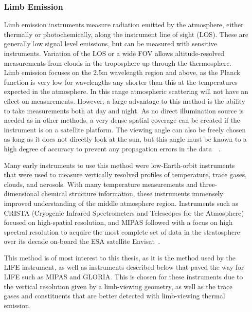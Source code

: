 \subsubsection{Limb Emission}
Limb emission instruments measure radiation emitted by the atmosphere, either thermally or photochemically, along the instrument line of sight (LOS). These are generally low signal level emissions, but can be measured with sensitive instruments. Variation of the LOS or a wide FOV allows altitude-resolved measurements from clouds in the troposphere up through the thermosphere. Limb emission focuses on the 2.5\textmu m wavelength region and above, as the Planck function is very low for wavelengths any shorter than this at the temperatures expected in the atmosphere. In this range atmospheric scattering will not have an effect on measurements. However, a large advantage to this method is the ability to take measurements both at day and night. As no direct illumination source is needed as in other methods, a very dense spatial coverage can be created if the instrument is on a satellite platform. The viewing angle can also be freely chosen as long as it does not directly look at the sun, but this angle must be known to a high degree of accuracy to prevent any propagation errors in the data~\citep{IR_limb_emission_measurements}~\citep{SPARC}.

Many early instruments to use this method were low-Earth-orbit instruments that were used to measure vertically resolved profiles of temperature, trace gases, clouds, and aerosols. With many temperature measurements and three-dimensional chemical structure information, these instruments immensely improved understanding of the middle atmosphere region. Instruments such as CRISTA (Cryogenic Infrared Spectrometers and Telescopes for the Atmosphere) focused on high-spatial resolution, and MIPAS followed with a focus on high spectral resolution to acquire the most complete set of data in the stratosphere over its decade on-board the ESA satellite Envisat~\cite{GLORIA_objectives}.

This method is of most interest to this thesis, as it is the method used by the LIFE instrument, as well as instruments described below that paved the way for LIFE such as MIPAS and GLORIA. This is chosen for these instruments due to the vertical resolution given by a limb-viewing geometry, as well as the trace gases and constituents that are better detected with limb-viewing thermal emission.

